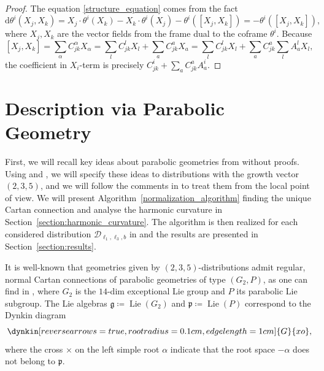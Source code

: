 \documentclass{amsart}
\theoremstyle{plain}
\theoremstyle{definition}
\theoremstyle{remark}
\newcommand{\mc}[1]{\mathcal{#1}}
\newcommand{\mfk}[1]{\mathfrak{#1}}
\newcommand{\on}[1]{\operatorname{#1}}
\newcommand{\di}{\mathrm{d}}
\begin{document}
\begin{proof}
    The equation \eqref{structure_equation} comes from the fact
    \[ \di \theta^i (X_j,X_k) = X_j \cdot \theta^i(X_k) - X_k \cdot \theta^i(X_j) - \theta^i([X_j,X_k]) = - \theta^i([X_j,X_k]), \]
    where $X_j, X_k$ are the vector fields from the frame dual to the coframe $\theta^i$. Because
    \[ [X_j,X_k] = \sum_{\alpha} C_{jk}^\alpha X_\alpha = \sum_{l} C_{jk}^l X_l + \sum_{a} C_{jk}^a X_a = \sum_{l} C_{jk}^l X_l + \sum_{a} C_{jk}^a \sum_l A_a^l X_l, \]
    the coefficient in $X_i$-term is precisely $C_{jk}^i + \sum_a C_{jk}^a A_a^i$.
\end{proof}
%

\section{Description via Parabolic Geometry} \label{section:parabolic}
%
First, we will recall key ideas about parabolic geometries from \cite[pp. 234-271]{parabook} without proofs. Using \cite[p.~431]{parabook} and \cite{dt2022}, we will specify these ideas to distributions with the growth vector $(2,3,5)$, and we will follow the comments in \cite[p.~77]{parabook} to treat them from the local point of view. We will present Algorithm~\eqref{normalization_algorithm} finding
the unique Cartan connection and analyse the harmonic curvature in Section~\ref{section:harmonic_curvature}. The algorithm is then realized for each considered distribution $\mc{D}_{\ell_1,\ell_3,b}$ in \cite[\texttt{normalization.mw}]{attached_files} and the results are presented in Section~\ref{section:results}.

It is well-known that geometries given by $(2,3,5)$-distributions admit regular, normal Cartan connections of parabolic geometries of type $(G_2,P)$, as one can find in \cite[pp., 431]{parabook}, where $G_2$ is the $14$-dim exceptional Lie group and $P$ its parabolic Lie subgroup. The Lie algebras $\mfk{g} \coloneqq \on{Lie}(G_2)$ and $\mfk{p} \coloneqq \on{Lie}(P)$ correspond to the Dynkin diagram
\begin{equation}\label{dynkin_g2}
    \dynkin[reverse arrows=true, root radius=0.1cm, edge length=1cm]{G}{xo},
\end{equation}
where the cross $\times$ on the left simple root $\alpha$ indicate that the root space $-\alpha$ does not belong to $\mfk{p}$.
\end{document}
